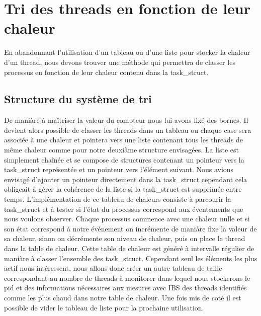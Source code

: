 	\section{Tri des threads en fonction de leur chaleur}
		En abandonnant l'utilisation d'un tableau ou d'une liste pour stocker la chaleur d'un thread, nous devons trouver une méthode qui permettra de classer les processus en fonction de leur chaleur contenu dans la task\_struct.
		\subsection{Structure du système de tri}
			De maniàre à maîtriser la valeur du compteur nous lui avons fixé des bornes. Il devient alors possible de classer les threads dans un tableau ou chaque case sera associée à une chaleur et pointera vers une liste contenant tous les threads de même chaleur comme pour notre deuxiàme structure envisagées.
			La liste est simplement chaînée et se compose de structures contenant un pointeur vers la task\_struct représentée et un pointeur vers l'élément suivant. Nous avions envisagé d'ajouter un pointeur directement dans la task\_struct cependant cela obligeait à gérer la cohérence de la liste si la task\_struct est supprimée entre temps.
			L'implémentation de ce tableau de chaleurs consiste à parcourir la task\_struct et à tester si l'état du processus correspond aux éventements que nous voulons observer. Chaque processus commence avec une chaleur nulle et si son état correspond à notre événement on incrémente de maniàre fixe la valeur de sa chaleur, sinon on décrémente son niveau de chaleur, puis on place le thread dans la table de chaleur.
			Cette table de chaleur est généré à intervalle régulier de maniàre à classer l'ensemble des task\_struct. Cependant seul les éléments les plus actif nous intéressent, nous allons donc créer un autre tableau de taille correspondant au nombre de threads à monitorer dans lequel nous stockerons le pid et des informations nécessaires aux mesures avec IBS des threads identifiés comme les plus chaud dans notre table de chaleur. Une fois mis de coté il est possible de vider le tableau de liste pour la prochaine utilisation.
